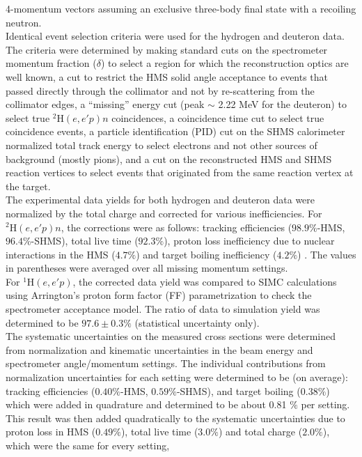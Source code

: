 \documentclass[aps,prl,twocolumn,showpacs,superscriptaddress,groupedaddress,nofootinbib]{revtex4-2}  %
\begin{document}
4-momentum vectors assuming an exclusive three-body final state with a recoiling neutron.\\
\indent Identical event selection criteria were used for the hydrogen and deuteron data. The criteria were determined by making standard cuts on the spectrometer momentum fraction ($\delta$) to select a region for which the reconstruction optics
are well known,  a cut to restrict the HMS solid angle acceptance to events that passed directly through the collimator and not by re-scattering from the collimator edges, a ``missing''
energy cut (peak $\sim$ 2.22 MeV for the deuteron) to select true $^{2}\mathrm{H}(e,e'p)n$ coincidences, a coincidence time cut to select true coincidence events, a particle identification (PID) cut on the
SHMS calorimeter normalized total track energy to select electrons and not other sources of background (mostly pions), and a cut on the reconstructed HMS and SHMS reaction vertices to select events that 
originated from the same reaction vertex at the target.\\
\indent The experimental data yields for both hydrogen and deuteron data were normalized by the total charge and corrected for various inefficiencies. For $^{2}\mathrm{H}(e,e'p)n$, the corrections
were as follows: tracking efficiencies ($98.9 \%$-HMS, $96.4 \%$-SHMS), total live time ($92.3 \%$), proton loss inefficiency due to nuclear interactions in the HMS ($4.7 \%$) \cite{cyero_phdthesis} and
target boiling inefficiency ($4.2 \%$) \cite{cyero_phdthesis}. The values in parentheses were averaged over all missing momentum settings. \\
\indent For $^{1}\mathrm{H}(e,e'p)$, the corrected data yield was compared to SIMC calculations using Arrington's proton form factor (FF) parametrization \cite{PhysRevC.69.022201} to check the spectrometer acceptance
model. The ratio of data to simulation yield was determined to be $97.6\pm0.3 \%$ (statistical uncertainty only).\\
\indent The systematic uncertainties on the measured cross sections were determined from 
normalization and kinematic uncertainties in the beam energy and spectrometer angle/momentum settings. The individual
contributions from normalization uncertainties for each setting were determined to be (on average): tracking efficiencies ($0.40 \%$-HMS, $0.59 \%$-SHMS),
and target boiling ($0.38 \%$) which were added in quadrature and determined to be about 0.81 $\%$ per setting. This result was then added quadratically to
the systematic uncertainties due to proton loss in HMS ($0.49 \%$), total live time ($3.0 \%$) and total charge ($2.0\%$), which were the same for every setting,
\end{document}
